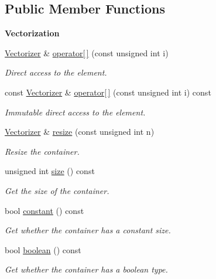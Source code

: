 \subsection*{Public Member Functions}
\begin{Indent}{\bf Vectorization}\par
\begin{DoxyCompactItemize}
\item 
\hyperlink{classmagrathea_1_1Vectorizer}{Vectorizer} \& \hyperlink{classmagrathea_1_1Vectorizer_a83ebb071ab30dce7af155d3c0e597fb9}{operator\mbox{[}$\,$\mbox{]}} (const unsigned int i)
\begin{DoxyCompactList}\small\item\em Direct access to the element. \end{DoxyCompactList}\item 
const \hyperlink{classmagrathea_1_1Vectorizer}{Vectorizer} \& \hyperlink{classmagrathea_1_1Vectorizer_aa058daf8b240bb587b80888ab88340c7}{operator\mbox{[}$\,$\mbox{]}} (const unsigned int i) const 
\begin{DoxyCompactList}\small\item\em Immutable direct access to the element. \end{DoxyCompactList}\item 
\hyperlink{classmagrathea_1_1Vectorizer}{Vectorizer} \& \hyperlink{classmagrathea_1_1Vectorizer_afe3c5369c91276766e0197fa33ae4951}{resize} (const unsigned int n)
\begin{DoxyCompactList}\small\item\em Resize the container. \end{DoxyCompactList}\item 
unsigned int \hyperlink{classmagrathea_1_1Vectorizer_a3b54f2b5f17c2054f99e03c7c4614558}{size} () const 
\begin{DoxyCompactList}\small\item\em Get the size of the container. \end{DoxyCompactList}\item 
bool \hyperlink{classmagrathea_1_1Vectorizer_a2e30cc7971bfbcf7b21f993b56c0644e}{constant} () const 
\begin{DoxyCompactList}\small\item\em Get whether the container has a constant size. \end{DoxyCompactList}\item 
bool \hyperlink{classmagrathea_1_1Vectorizer_ab5100fafcacd2c835380dbe0403422ec}{boolean} () const 
\begin{DoxyCompactList}\small\item\em Get whether the container has a boolean type. \end{DoxyCompactList}\item 

\end{DoxyCompactItemize}
\end{Indent}
